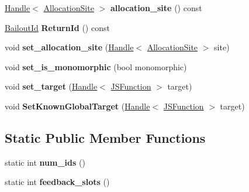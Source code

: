 \begin{DoxyCompactItemize}
\item 
\hyperlink{classv8_1_1internal_1_1_handle}{Handle}$<$ \hyperlink{classv8_1_1internal_1_1_allocation_site}{Allocation\+Site} $>$ {\bfseries allocation\+\_\+site} () const \hypertarget{classv8_1_1internal_1_1_call_new_a41807d32665995e0393bb5a0e20aee6b}{}\label{classv8_1_1internal_1_1_call_new_a41807d32665995e0393bb5a0e20aee6b}

\item 
\hyperlink{classv8_1_1internal_1_1_bailout_id}{Bailout\+Id} {\bfseries Return\+Id} () const \hypertarget{classv8_1_1internal_1_1_call_new_a228c890357c87c936a4e9c692fae963f}{}\label{classv8_1_1internal_1_1_call_new_a228c890357c87c936a4e9c692fae963f}

\item 
void {\bfseries set\+\_\+allocation\+\_\+site} (\hyperlink{classv8_1_1internal_1_1_handle}{Handle}$<$ \hyperlink{classv8_1_1internal_1_1_allocation_site}{Allocation\+Site} $>$ site)\hypertarget{classv8_1_1internal_1_1_call_new_a7ac1c717370129231c5c618a9e1ae455}{}\label{classv8_1_1internal_1_1_call_new_a7ac1c717370129231c5c618a9e1ae455}

\item 
void {\bfseries set\+\_\+is\+\_\+monomorphic} (bool monomorphic)\hypertarget{classv8_1_1internal_1_1_call_new_aaaad1d83139a4a52220d4e4a9739ba7f}{}\label{classv8_1_1internal_1_1_call_new_aaaad1d83139a4a52220d4e4a9739ba7f}

\item 
void {\bfseries set\+\_\+target} (\hyperlink{classv8_1_1internal_1_1_handle}{Handle}$<$ \hyperlink{classv8_1_1internal_1_1_j_s_function}{J\+S\+Function} $>$ target)\hypertarget{classv8_1_1internal_1_1_call_new_a9df093181f00a9efc785b233ced40082}{}\label{classv8_1_1internal_1_1_call_new_a9df093181f00a9efc785b233ced40082}

\item 
void {\bfseries Set\+Known\+Global\+Target} (\hyperlink{classv8_1_1internal_1_1_handle}{Handle}$<$ \hyperlink{classv8_1_1internal_1_1_j_s_function}{J\+S\+Function} $>$ target)\hypertarget{classv8_1_1internal_1_1_call_new_add4a3fe519bcf355781b489d52c8da66}{}\label{classv8_1_1internal_1_1_call_new_add4a3fe519bcf355781b489d52c8da66}

\end{DoxyCompactItemize}
\subsection*{Static Public Member Functions}
\begin{DoxyCompactItemize}
\item 
static int {\bfseries num\+\_\+ids} ()\hypertarget{classv8_1_1internal_1_1_call_new_adacb2568b151911e9c24f3604586e854}{}\label{classv8_1_1internal_1_1_call_new_adacb2568b151911e9c24f3604586e854}

\item 
static int {\bfseries feedback\+\_\+slots} ()\hypertarget{classv8_1_1internal_1_1_call_new_a5bf708e596ff9c3dedefcf333611ac5e}{}\label{classv8_1_1internal_1_1_call_new_a5bf708e596ff9c3dedefcf333611ac5e}

\end{DoxyCompactItemize}
